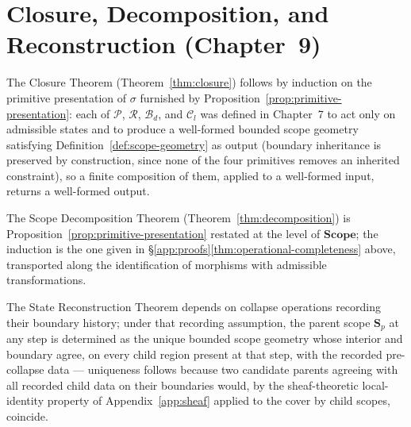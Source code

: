 \documentclass[11pt,twoside,openright]{book}
\numberwithin{equation}{chapter}
\theoremstyle{definition}
\theoremstyle{plain}
\theoremstyle{remark}
\theoremstyle{definition}
\newcommand{\CatScope}{\mathbf{Scope}}
\newcommand{\Scope}{\mathbf{S}}
\newcommand{\ScopeMorph}{\sigma}
\newcommand{\Pop}{\mathcal{P}}
\newcommand{\Refuse}{\mathcal{R}}
\newcommand{\Bind}{\mathcal{B}_d}
\newcommand{\Collapse}{\mathcal{C}_l}
\begin{document}
\section{Closure, Decomposition, and Reconstruction (Chapter~9)}

The Closure Theorem (Theorem~\ref{thm:closure}) follows by induction on
the primitive presentation of $\ScopeMorph$ furnished by
Proposition~\ref{prop:primitive-presentation}: each of $\Pop$, $\Refuse$,
$\Bind$, and $\Collapse$ was defined in Chapter~7 to act only on
admissible states and to produce a well-formed bounded scope geometry
satisfying Definition~\ref{def:scope-geometry} as output (boundary
inheritance is preserved by construction, since none of the four
primitives removes an inherited constraint), so a finite composition of
them, applied to a well-formed input, returns a well-formed output.

The Scope Decomposition Theorem (Theorem~\ref{thm:decomposition}) is
Proposition~\ref{prop:primitive-presentation} restated at the level of
$\CatScope$; the induction is the one given in
\S\ref{app:proofs}\ref{thm:operational-completeness} above, transported
along the identification of morphisms with admissible transformations.

The State Reconstruction Theorem depends on collapse operations recording
their boundary history; under that recording assumption, the parent scope
$\Scope_p$ at any step is determined as the unique bounded scope geometry
whose interior and boundary agree, on every child region present at that
step, with the recorded pre-collapse data --- uniqueness follows because
two candidate parents agreeing with all recorded child data on their
boundaries would, by the sheaf-theoretic local-identity property of
Appendix~\ref{app:sheaf} applied to the cover by child scopes, coincide.




\cleardoublepage
\printindex[symbols]
\end{document}
